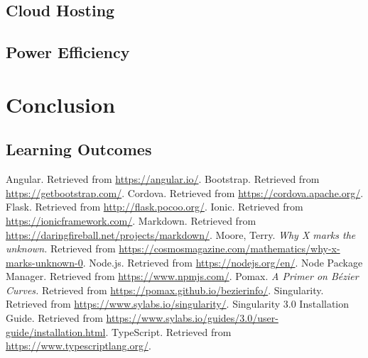 \documentclass[12pt]{report}
\begin{document}
    \section{Cloud Hosting}
    \section{Power Efficiency}

\chapter{Conclusion}
    \section{Learning Outcomes}

\begin{thebibliography}{9}
     Angular. Retrieved from \url{https://angular.io/}.
     Bootstrap. Retrieved from
        \url{https://getbootstrap.com/}.
     Cordova. Retrieved from \url{https://cordova.apache.org/}.
     Flask. Retrieved from \url{http://flask.pocoo.org/}.
     Ionic. Retrieved from \url{https://ionicframework.com/}.
     Markdown. Retrieved from
        \url{https://daringfireball.net/projects/markdown/}.
     Moore, Terry. \textit{Why X marks the unknown.} Retrieved
        from \url{https://cosmosmagazine.com/mathematics/why-x-marks-unknown-0}.
     Node\@.js. Retrieved from \url{https://nodejs.org/en/}.
     Node Package Manager. Retrieved from \url{https://www.npmjs.com/}.
     Pomax. \textit{A Primer on Bézier Curves.} Retrieved from
        \url{https://pomax.github.io/bezierinfo/}.
     Singularity. Retrieved from \url{https://www.sylabs.io/singularity/}.
     Singularity 3\@.0 Installation Guide. Retrieved
        from
        \url{https://www.sylabs.io/guides/3.0/user-guide/installation.html}.
     TypeScript. Retrieved from
        \url{https://www.typescriptlang.org/}.
\end{thebibliography}
\end{document}
